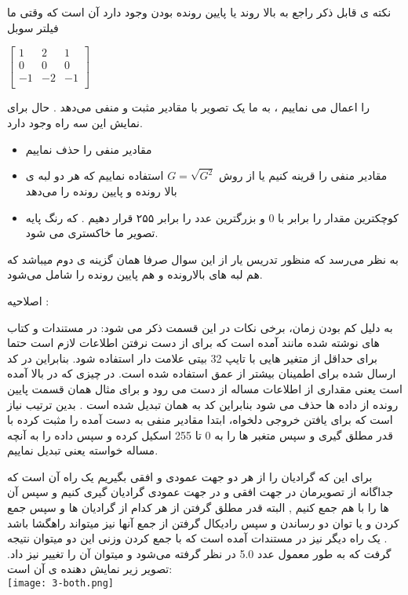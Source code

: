 \documentclass[12pt]{article}
\begin{document}
		نکته ی قابل ذکر راجع به بالا روند یا پایین رونده بودن وجود دارد آن است که وقتی ما فیلتر سوبل 
		
		$
		\begin{bmatrix}
			1 & 2 & 1 \\
			0 & 0 & 0 \\
			-1 & -2 & -1 \\
		\end{bmatrix}
	$

را اعمال می نماییم ، به ما یک تصویر با مقادیر مثبت و منفی می‌دهد . حال برای نمایش این سه راه وجود دارد. 
\begin{itemize}
	\item
 مقادیر منفی را حذف نماییم
	\item 
	مقادیر منفی را قرینه کنیم یا از روش 
	$G = \sqrt {G^2 }$
	استفاده نماییم که هر دو لبه ی بالا رونده و پایین رونده را می‌دهد 
	\item 
	کوچکترین مقدار را برابر با 0 و بزرگترین عدد را برابر ۲۵۵ قرار دهیم . که رنگ پایه تصویر ما خاکستری می شود.
\end{itemize}

به نظر می‌رسد که منظور تدریس یار از این سوال صرفا همان گزینه ی دوم میباشد که هم لبه های بالارونده و هم پایین رونده را شامل می‌شود. 
 
 
 اصلاحیه :‌
 
 به دلیل کم بودن زمان، برخی نکات در این قسمت ذکر می شود:
  در مستندات 
   و کتاب های نوشته شده مانند 
  آمده است که برای از دست نرفتن اطلاعات لازم است حتما برای 
  حداقل از متغیر هایی با تایپ 32 بیتی علامت دار استفاده شود. 
 بنابراین در کد ارسال شده برای اطمینان بیشتر از عمق 
 استفاده شده است. در چیزی که در بالا آمده است یعنی 
 مقداری از اطلاعات مساله از دست می رود و برای مثال همان قسمت پایین رونده از داده ها حذف می شود بنابراین کد به همان 
 تبدیل شده است . بدین ترتیب نیاز است که برای یافتن خروجی دلخواه، ابتدا مقادیر منفی به دست آمده را مثبت کرده با قدر مطلق گیری و سپس متغبر ها را به 0 تا 255 اسکیل کرده و سپس داده را به آنچه مساله خواسته یعنی 
 تبدیل نماییم.  
 
 
		برای این که گرادیان را  از هر دو جهت عمودی و افقی بگیریم یک راه آن است که جداگانه از تصویرمان در جهت افقی و در جهت عمودی گرادیان گیری کنیم و سپس آن ها را با هم جمع کنیم , 
		البته قدر مطلق گرفتن از هر کدام از گرادیان ها و سپس جمع کردن و یا توان دو رساندن و سپس رادیکال گرفتن از جمع آنها  نیز میتواند راهگشا باشد .
		یک راه دیگر نیز در مستندات آمده است که با جمع کردن وزنی این دو میتوان نتیجه گرفت که به طور معمول عدد 5.0 در نظر گرفته می‌شود و میتوان آن را تغییر نیز داد.
		تصویر زیر نمایش دهنده ی آن است:\\
		\texttt{[image: 3-both.png]}
		
\end{document}
